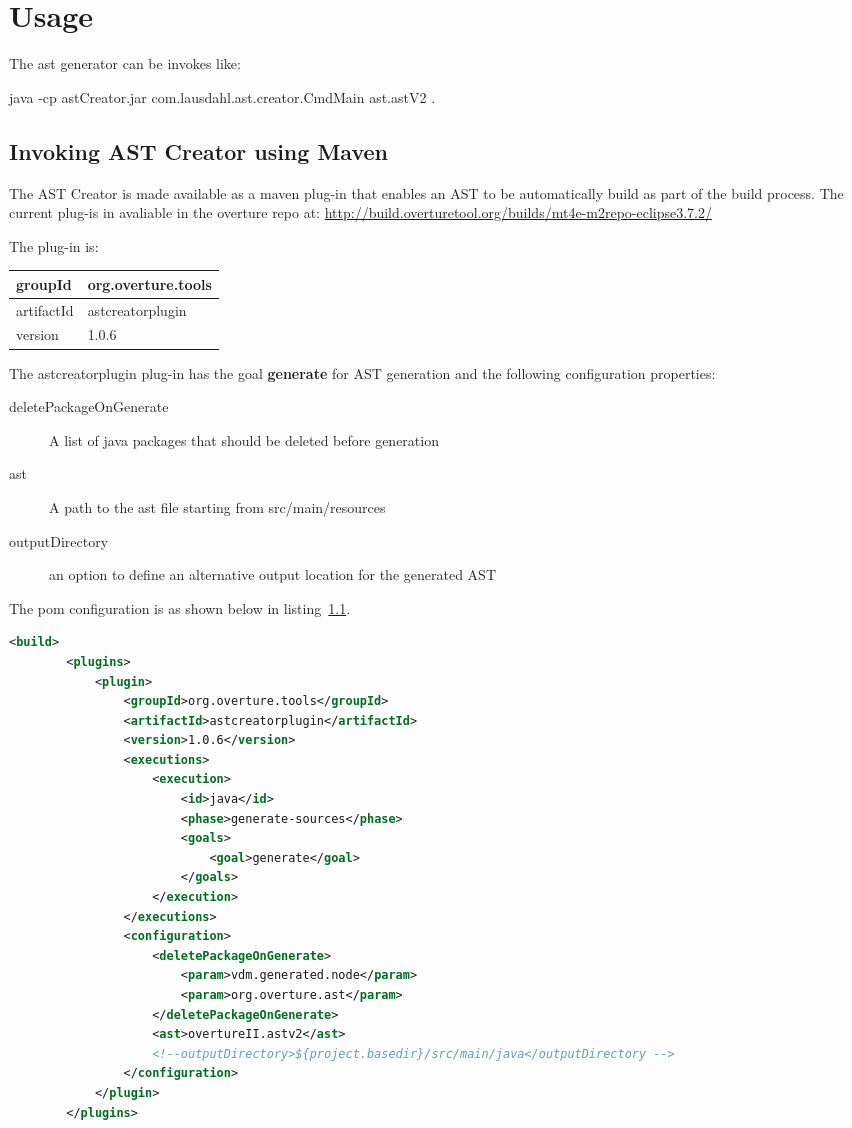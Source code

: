 \documentclass{overturerepchap}
\begin{document}
\section{Usage}
The ast generator can be invokes like: 

\begin{astlst}
java -cp astCreator.jar com.lausdahl.ast.creator.CmdMain ast.astV2 .
\end{astlst}

\subsection{Invoking AST Creator using Maven}

The AST Creator is made available as a maven plug-in that enables an AST to be automatically build as part of the build process. The current plug-is in avaliable in the overture repo at: \url{http://build.overturetool.org/builds/mt4e-m2repo-eclipse3.7.2/}

The plug-in is:

\begin{tabular}{ |l|l| }\hline
  groupId & org.overture.tools\\\hline
artifactId &astcreatorplugin\\\hline
version & 1.0.6\\\hline
\end{tabular}

The astcreatorplugin plug-in has the goal \textbf{generate} for AST generation and the following configuration properties:

\begin{description}
\item[deletePackageOnGenerate] A list of java packages that should be deleted before generation
\item[ast] A path to the ast file starting from src/main/resources
\item[outputDirectory] an option to define an alternative output location for the generated AST
\end{description}

The pom configuration is as shown below in listing~\ref{}.

\begin{lstlisting}[language=XML,tabsize=2,basicstyle=\ttfamily\footnotesize]
<build>
		<plugins>
			<plugin>
				<groupId>org.overture.tools</groupId>
				<artifactId>astcreatorplugin</artifactId>
				<version>1.0.6</version>
				<executions>
					<execution>
						<id>java</id>
						<phase>generate-sources</phase>
						<goals>
							<goal>generate</goal>
						</goals>
					</execution>
				</executions>
				<configuration>
					<deletePackageOnGenerate>
						<param>vdm.generated.node</param>
						<param>org.overture.ast</param>
					</deletePackageOnGenerate>
					<ast>overtureII.astv2</ast>
					<!--outputDirectory>${project.basedir}/src/main/java</outputDirectory -->
				</configuration>
			</plugin>
		</plugins>
\end{lstlisting}
\end{document}
